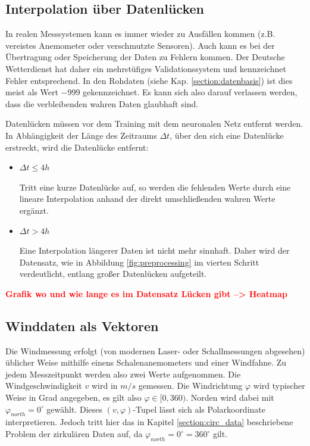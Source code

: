 \documentclass[
12pt, %
toc=listofnumbered, %
toc=chapterentrydotfill, %
numbers=noenddot, %
captions=tableheading, %
bibliography=numbered
]{scrreprt}
\let\Oldsubsection\subsection
\renewcommand{\subsection}{\FloatBarrier\Oldsubsection}
\newcommand{\qm}[1]{\glqq#1\grqq{}} %
\newcommand{\highlight}[1]{\textbf{\textcolor{red}{#1}}}
\begin{document}
\subsection{Interpolation über Datenlücken}\label{section:Datenlücken}

In realen Messsystemen kann es immer wieder zu Ausfällen kommen (z.B. vereistes Anemometer oder verschmutzte Sensoren). Auch kann es bei der Übertragung oder Speicherung der Daten zu Fehlern kommen. Der Deutsche Wetterdienst hat daher ein mehrstüfiges Validationssystem und kennzeichnet Fehler entsprechend. In den Rohdaten (siehe Kap. \ref{section:datenbasis}) ist dies meist als Wert $-999$ gekennzeichnet. Es kann sich also darauf verlassen werden, dass die verbleibenden \qm{wahren} Daten glaubhaft sind. 

Datenlücken müssen vor dem Training mit dem neuronalen Netz entfernt werden. In Abhängigkeit der Länge des Zeitraums $\Delta t$, über den sich eine Datenlücke erstreckt, wird die Datenlücke entfernt:

\begin{itemize}
	\item $\Delta t \leq 4h$
	
	Tritt eine kurze Datenlücke auf, so werden die fehlenden Werte durch eine lineare Interpolation anhand der direkt umschließenden wahren Werte ergänzt.

	\item $\Delta t > 4h$

	Eine Interpolation längerer Daten ist nicht mehr sinnhaft. Daher wird der Datensatz, wie in Abbildung \ref{fig:preprocessing} im vierten Schritt verdeutlicht, entlang großer Datenlücken aufgeteilt.

\end{itemize}

\highlight{Grafik wo und wie lange es im Datensatz Lücken gibt --> Heatmap}

\subsection{Winddaten als Vektoren}
Die Windmessung erfolgt (von modernen Laser- oder Schallmessungen abgesehen) üblicher Weise mithilfe einens Schalenanemometers und einer Windfahne. Zu jedem Messzeitpunkt werden also zwei Werte aufgenommen. Die Windgeschwindigkeit $v$ wird in $m/s$ gemessen. Die Windrichtung $\varphi$ wird typischer Weise in Grad angegeben, es gilt also $\varphi \in [0,360)$. Norden wird dabei mit $\varphi_{north} = 0^\circ$ gewählt. Dieses $(v,\varphi)$-Tupel lässt sich als Polarkoordinate interpretieren. Jedoch tritt hier das in Kapitel \ref{section:circ_data} beschriebene Problem der zirkulären Daten auf, da $\varphi_{north} = 0^\circ = 360^\circ$ gilt.
\end{document}
